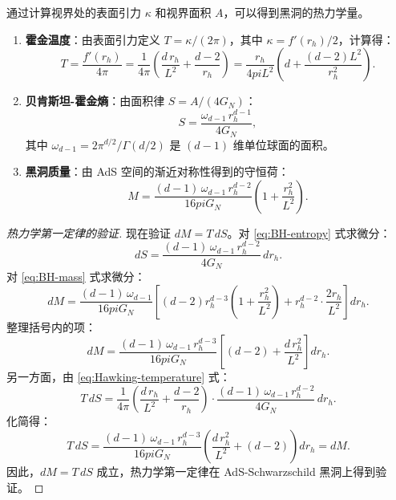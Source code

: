 \begin{property}\label{prop:BH-thermo-quantities}
通过计算视界处的表面引力 $\kappa$ 和视界面积 $A$，可以得到黑洞的热力学量。
\begin{enumerate}
    \item \textbf{霍金温度}：由表面引力定义 $T = \kappa/(2\pi)$，其中 $\kappa = f'(r_h)/2$，计算得：
    \begin{equation}\label{eq:Hawking-temperature}
        T = \frac{f'(r_h)}{4\pi} = \frac{1}{4\pi}\left(\frac{d\, r_h}{L^2} + \frac{d-2}{r_h}\right) = \frac{r_h}{4pi L^2}\left(d + \frac{(d-2)L^2}{r_h^2}\right).
    \end{equation}

    \item \textbf{贝肯斯坦-霍金熵}：由面积律 $S = A/(4G_N)$：
    \begin{equation}\label{eq:BH-entropy}
        S = \frac{\omega_{d-1}\, r_h^{d-1}}{4 G_N},
    \end{equation}
    其中 $\omega_{d-1} = 2\pi^{d/2}/\Gamma(d/2)$ 是 $(d-1)$ 维单位球面的面积。

    \item \textbf{黑洞质量}：由 AdS 空间的渐近对称性得到的守恒荷：
    \begin{equation}\label{eq:BH-mass}
        M = \frac{(d-1)\,\omega_{d-1}\, r_h^{d-2}}{16pi G_N}\left(1 + \frac{r_h^2}{L^2}\right).
    \end{equation}
\end{enumerate}
\end{property}

\begin{proof}[热力学第一定律的验证]
现在验证 $dM = T\,dS$。对 \eqref{eq:BH-entropy} 式求微分：
\begin{equation}
    dS = \frac{(d-1)\,\omega_{d-1}\, r_h^{d-2}}{4 G_N}\, dr_h.
\end{equation}
对 \eqref{eq:BH-mass} 式求微分：
\begin{equation}
    dM = \frac{(d-1)\,\omega_{d-1}}{16pi G_N}\left[(d-2)r_h^{d-3}\left(1+\frac{r_h^2}{L^2}\right) + r_h^{d-2}\cdot\frac{2r_h}{L^2}\right] dr_h.
\end{equation}
整理括号内的项：
\begin{equation}
    dM = \frac{(d-1)\,\omega_{d-1}\, r_h^{d-3}}{16pi G_N}\left[(d-2) + \frac{d\, r_h^2}{L^2}\right] dr_h.
\end{equation}
另一方面，由 \eqref{eq:Hawking-temperature} 式：
\begin{equation}
    T\,dS = \frac{1}{4\pi}\left(\frac{d\, r_h}{L^2} + \frac{d-2}{r_h}\right)\cdot\frac{(d-1)\,\omega_{d-1}\, r_h^{d-2}}{4 G_N}\, dr_h.
\end{equation}
化简得：
\begin{equation}
    T\,dS = \frac{(d-1)\,\omega_{d-1}\, r_h^{d-3}}{16pi G_N}\left(\frac{d\, r_h^2}{L^2} + (d-2)\right) dr_h = dM.
\end{equation}
因此，$dM = T\,dS$ 成立，热力学第一定律在 AdS-Schwarzschild 黑洞上得到验证。
\end{proof}

